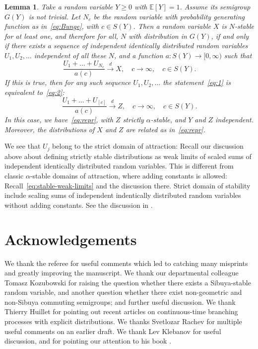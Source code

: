 \documentclass[12pt]{amsart}
\newtheorem{lemma}{Lemma}[section]
\theoremstyle{remark}
\theoremstyle{definition}
\begin{document}
\begin{lemma} Take a random variable $Y \ge 0$ with $\mathbb E[Y] = 1$. Assume its semigroup $G(Y)$ is not trivial. Let $N_c$ be the random variable with probability generating function as in~\eqref{eq:Bunge}, with $c \in S(Y)$. Then a random variable  
$X$ is $N$-stable for at least one, and therefore for all, $N$ with distribution in $G(Y)$, if and only if there exists a sequence of independent identically distributed random variables $U_1, U_2,\ldots$ independent of all these $N$, and a function $a : S(Y) \to [0, \infty)$ such that 
\begin{equation}
\label{eq:1}
\frac{U_1 + \ldots + U_{N_c}}{a(c)} \stackrel{d}{\to} X,\quad c \to \infty,\quad c \in S(Y).
\end{equation}
If this is true, then for any such sequence $U_1, U_2, \ldots$ the statement~\eqref{eq:1} is equivalent to~\eqref{eq:2}:
\begin{equation}
\label{eq:2}
\frac{U_1 + \ldots + U_{[c]}}{a(c)} \stackrel{d}{\to} Z,\quad c \to \infty,\quad c \in S(Y).
\end{equation}
In this case, we have~\eqref{eq:repr}, with $Z$ strictly $\alpha$-stable, and $Y$ and $Z$ independent. Moreover, the distributions of $X$ and $Z$ are related as in~\eqref{eq:repr}. 
\label{lemma:equiv}
\end{lemma}

We see that $U_j$ belong to the strict domain of attraction: Recall our discussion above about defining strictly stable distributions as weak limits of scaled sums of independent identically distributed random variables. This is different from classic 
$\alpha$-stable domains of attraction, where adding constants is allowed: Recall~\eqref{eq:stable-weak-limits} and the discussion there. Strict domain of stability include scaling sums of independent indentically distributed random variables without  adding constants. See the discussion in \cite[Section 2]{Anna}.

\section*{Acknowledgements} 

We thank the referee for useful comments which led to catching many misprints and greatly improving the manuscript. We thank our departmental colleague Tomasz Kozubowski for raising the question whether there exists a Sibuya-stable random variable, and another question whether there exist non-geometric and non-Sibuya commuting semigroups; and further useful discussion. We thank Thierry Huillet for pointing out recent articles on continuous-time branching processes with explicit distributions. We thanks Svetlozar Rachev for multiple useful comments on an earlier draft. We thank Lev Klebanov for useful discussion, and for pointing our attention to his book \cite{KlebanovBook}.
\end{document}
